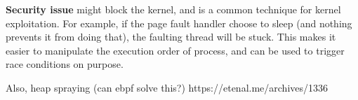 
\textbf{Security issue} \uffd might block the kernel\cite{uffd-blocking}, and is a common technique for kernel exploitation. For example, if the page fault handler choose to sleep (and nothing prevents it from doing that), the faulting thread will be stuck. This makes it easier to manipulate the execution order of process, and can be used to trigger race conditions on purpose. 


Also, heap spraying (can ebpf solve this?)
https://etenal.me/archives/1336
